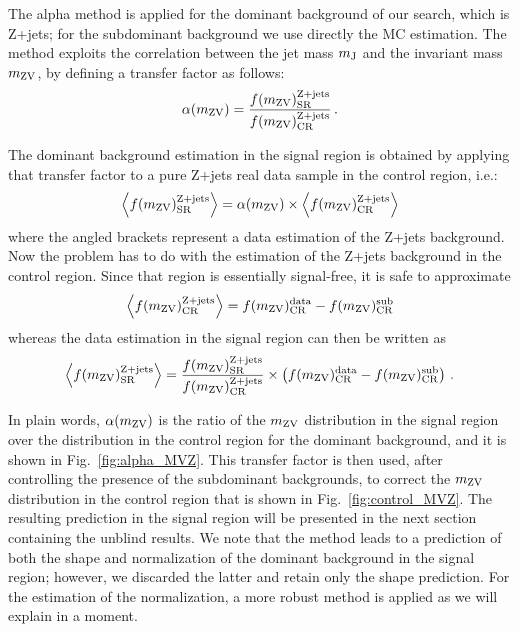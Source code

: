 The alpha method is applied for the dominant background of our search, which is Z+jets; for the subdominant background we use directly the MC estimation. The method exploits the correlation between the jet mass $m_\mathrm{J}$ and the invariant mass $m_\mathrm{ZV}$, by defining a transfer factor as follows:
\begin{equation}
\alpha(m_\mathrm{ZV}) = \frac{f(m_\mathrm{ZV})^{\textrm{Z+jets}}_{\textrm{SR}}}{f(m_\mathrm{ZV})^{\textrm{Z+jets}}_{\textrm{CR}}}\,.
\end{equation}

The dominant background estimation in the signal region is obtained by applying that transfer factor to a pure Z+jets real data sample in the control region, i.e.:
\begin{equation}
\left \langle f(m_\mathrm{ZV})^{\textrm{Z+jets}}_{\textrm{SR}} \right \rangle = \alpha(m_\mathrm{ZV})
\times
\left \langle f(m_\mathrm{ZV})^{\textrm{Z+jets}}_{\textrm{CR}} \right \rangle
\end{equation}
where the angled brackets represent a data estimation of the Z+jets background. Now the problem has to do with the estimation of the Z+jets background in the control region. Since that region is essentially signal-free, it is safe to approximate
\begin{equation}
\left \langle f(m_\mathrm{ZV})^{\textrm{Z+jets}}_{\textrm{CR}} \right \rangle =
f(m_\mathrm{ZV})^{\textrm{data}}_{\textrm{CR}} - f(m_\mathrm{ZV})^{\textrm{sub}}_{\textrm{CR}}
\end{equation}
whereas the data estimation in the signal region can then be written as
\begin{equation}
\left \langle f(m_\mathrm{ZV})^{\textrm{Z+jets}}_{\textrm{SR}} \right \rangle
=
\frac{f(m_\mathrm{ZV})^{\textrm{Z+jets}}_{\textrm{SR}}}{f(m_\mathrm{ZV})^{\textrm{Z+jets}}_{\textrm{CR}}}
\times
\left (
f(m_\mathrm{ZV})^{\textrm{data}}_{\textrm{CR}} - f(m_\mathrm{ZV})^{\textrm{sub}}_{\textrm{CR}}
\right )\,.
\label{eq:domSR}
\end{equation}

In plain words, $\alpha(m_\mathrm{ZV})$ is the ratio of the $m_\mathrm{ZV}$ distribution in the signal region over the distribution in the control region for the dominant background, and it is shown in Fig.~\ref{fig:alpha_MVZ}. This transfer factor is then used, after controlling the presence of the subdominant backgrounds, to correct the $m_\mathrm{ZV}$ distribution in the control region that is shown in Fig.~\ref{fig:control_MVZ}. The resulting prediction in the signal region will be presented in the next section containing the unblind results. We note that the method leads to a prediction of both the shape and normalization of the dominant background in the signal region; however, we discarded the latter and retain only the shape prediction. For the estimation of the normalization, a more robust method is applied as we will explain in a moment.

